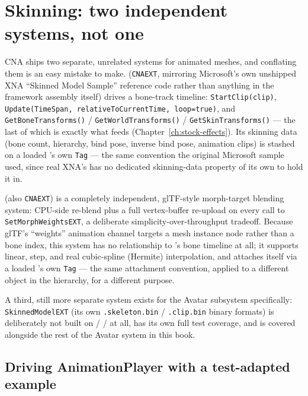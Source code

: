 \section{Skinning: two independent systems, not one}

CNA ships two separate, unrelated systems for animated meshes, and conflating them is an
easy mistake to make.  (\texttt{CNAEXT}, mirroring Microsoft's own
unshipped XNA ``Skinned Model Sample'' reference code rather than anything in the framework
assembly itself) drives a bone-track timeline: \texttt{StartClip(clip)},
\texttt{Update(TimeSpan, relativeToCurrentTime, loop=true)}, and
\texttt{GetBoneTransforms()} / \texttt{GetWorldTransforms()} / \texttt{GetSkinTransforms()} ---
the last of which is exactly what feeds 
(Chapter~\ref{ch:stock-effects}). Its skinning data (bone count, hierarchy, bind pose,
inverse bind pose, animation clips) is stashed on a loaded 's own
\texttt{Tag} --- the same convention the original Microsoft sample used, since real XNA's
 has no dedicated skinning-data property of its own to hold it in.

 (also \texttt{CNAEXT}) is a completely independent, glTF-style
morph-target blending system: CPU-side re-blend plus a full vertex-buffer re-upload on every
call to \texttt{SetMorphWeightsEXT}, a deliberate simplicity-over-throughput tradeoff.
Because glTF's ``weights'' animation channel targets a mesh instance node rather than a bone
index, this system has no relationship to 's bone timeline at all;
it supports linear, step, and real cubic-spline (Hermite) interpolation, and attaches itself
via a loaded 's own \texttt{Tag} --- the same attachment convention,
applied to a different object in the hierarchy, for a different purpose.

A third, still more separate system exists for the Avatar subsystem specifically:
\texttt{SkinnedModelEXT} (its own \texttt{.skeleton.bin} / \texttt{.clip.bin} binary formats) is
deliberately not built on  /  /  at all,
has its own full test coverage, and is covered alongside the rest of the Avatar system in
this book.

\subsection{Driving AnimationPlayer with a test-adapted example}
\label{sec:animation-player-worked-example}

